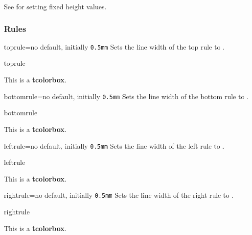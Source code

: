 See  for setting fixed height values.


\clearpage
\subsubsection{Rules}
\begin{docTcbKey}{toprule}{=}{no default, initially \texttt{0.5mm}}
  Sets the line width of the top rule to .
\begin{exdispExample}{toprule}

\begin{tcolorbox}[toprule=3mm]
This is a \textbf{tcolorbox}.
\end{tcolorbox}
\end{exdispExample}
\end{docTcbKey}


\begin{docTcbKey}{bottomrule}{=}{no default, initially \texttt{0.5mm}}
  Sets the line width of the bottom rule to .
\begin{exdispExample}{bottomrule}

\begin{tcolorbox}[bottomrule=3mm]
This is a \textbf{tcolorbox}.
\end{tcolorbox}
\end{exdispExample}
\end{docTcbKey}

\begin{docTcbKey}{leftrule}{=}{no default, initially \texttt{0.5mm}}
  Sets the line width of the left rule to .
\begin{exdispExample}{leftrule}

\begin{tcolorbox}[leftrule=3mm]
This is a \textbf{tcolorbox}.
\end{tcolorbox}
\end{exdispExample}
\end{docTcbKey}


\begin{docTcbKey}{rightrule}{=}{no default, initially \texttt{0.5mm}}
  Sets the line width of the right rule to .
\begin{exdispExample}{rightrule}

\begin{tcolorbox}[rightrule=3mm]
This is a \textbf{tcolorbox}.
\end{tcolorbox}
\end{exdispExample}
\end{docTcbKey}

